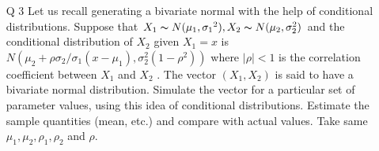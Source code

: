 \documentclass[12pt]{book}
\begin{document}
\begin{figure}[H]
	\centering
\end{figure}
\begin{figure}[H]
	\centering
\end{figure}
\newpage
\begin{enumerate}
\item[Q 3] Let us recall generating a bivariate normal with the help of conditional distributions.
Suppose that $X_1 \thicksim N (\mu_1 , {\sigma_1}^2 ), X_2 \thicksim N (\mu_2 , \sigma_2^2 )$ and the conditional distribution of
$X_2$ given $X_1 = x$ is $N (\mu_2 + \rho {\sigma_2/\sigma_1} (x - \mu_1 ), \sigma_2^2 (1 - {\rho}^2 ))$ where $|\rho| < 1$ is the correlation
coefficient between $X_1$ and $X_2$ . The vector $(X_1 , X_2 )$ is said to have a bivariate normal
distribution. Simulate the vector for a particular set of parameter values, using this
idea of conditional distributions. Estimate the sample quantities (mean, etc.) and
compare with actual values.
Take same $\mu_1 , \mu_2 , \rho_1 , \rho_2$ and $\rho$.\end{enumerate}
\end{document}
